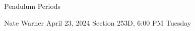 \documentclass{report}
\title{\Huge{}}
\author{\huge{Nathan Warner}}
\date{\huge{}}
\begin{document}
    \begin{center}
        \begin{Huge}
           Pendulum Periods 
        \end{Huge}
        \begin{Large}
            \bigbreak \noindent 
            Nate Warner
            \smallbreak \noindent
            April 23, 2024
            \bigbreak \noindent 
            Section 253D, 6:00 PM Tuesday 
        \end{Large}
    \end{center}
    \pagebreak 
    \tableofcontents
    \pagebreak 
\end{document}
